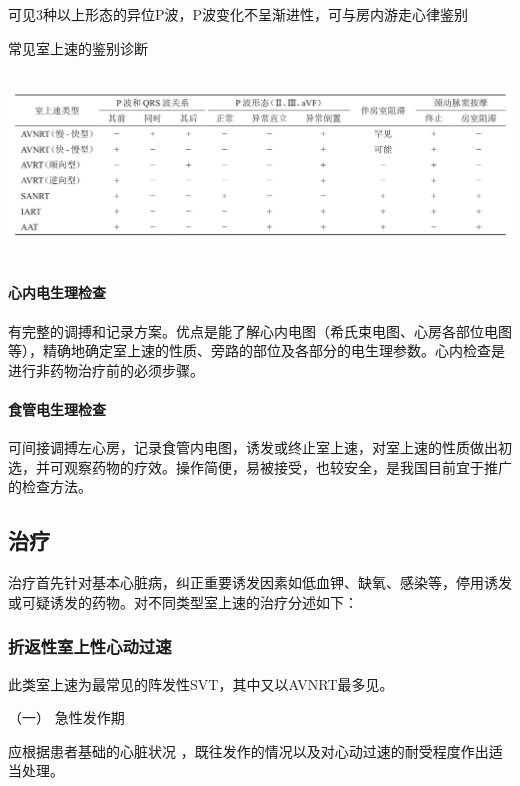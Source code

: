 可见3种以上形态的异位P波，P波变化不呈渐进性，可与房内游走心律鉴别

\begin{table}[htbp]
\centering
\caption{常见室上速的鉴别诊断}
\label{tab102-1}
\includegraphics[width=6.625in,height=1.94792in]{./images/Image00416.jpg}
\end{table}

\paragraph{心内电生理检查}

有完整的调搏和记录方案。优点是能了解心内电图（希氏束电图、心房各部位电图等），精确地确定室上速的性质、旁路的部位及各部分的电生理参数。心内检查是进行非药物治疗前的必须步骤。

\paragraph{食管电生理检查}

可间接调搏左心房，记录食管内电图，诱发或终止室上速，对室上速的性质做出初选，并可观察药物的疗效。操作简便，易被接受，也较安全，是我国目前宜于推广的检查方法。

\subsection{治疗}

治疗首先针对基本心脏病，纠正重要诱发因素如低血钾、缺氧、感染等，停用诱发或可疑诱发的药物。对不同类型室上速的治疗分述如下：

\subsubsection{折返性室上性心动过速}

此类室上速为最常见的阵发性SVT，其中又以AVNRT最多见。

\hypertarget{text00289.htmlux5cux23CHP10-2-2-3-1-1}{}
（一） 急性发作期

应根据患者基础的心脏状况
，既往发作的情况以及对心动过速的耐受程度作出适当处理。

